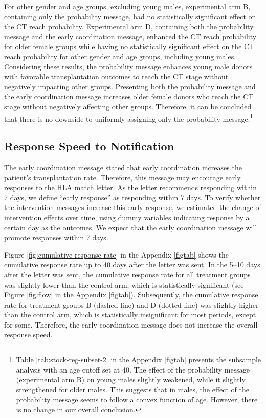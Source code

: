 \documentclass [12pt, a4paper]{article}
\begin{document}
For other gender and age groups, excluding young males, experimental arm B, containing only the probability message, had no statistically significant effect on the CT reach probability. Experimental arm D, containing both the probability message and the early coordination message, enhanced the CT reach probability for older female groups while having no statistically significant effect on the CT reach probability for other gender and age groups, including young males. Considering these results, the probability message enhances young male donors with favorable transplantation outcomes to reach the CT stage without negatively impacting other groups. Presenting both the probability message and the early coordination message increases older female donors who reach the CT stage without negatively affecting other groups. Therefore, it can be concluded that there is no downside to uniformly assigning only the probability message.\footnote{Table \ref{tab:stock-reg-subset-2} in the Appendix \ref{figtab} presents the subsample analysis with an age cutoff set at 40. The effect of the probability message (experimental arm B) on young males slightly weakened, while it slightly strengthened for older males. This suggests that in males, the effect of the probability message seems to follow a convex function of age. However, there is no change in our overall conclusion.}

\hypertarget{reply-speed}{%
\subsection{Response Speed to Notification}\label{reply-speed}}

The early coordination message stated that early coordination increases the patient's transplantation rate. Therefore, this message may encourage early responses to the HLA match letter. As the letter recommends responding within 7 days, we define ``early response'' as responding within 7 days. To verify whether the intervention messages increase this early response, we estimated the change of intervention effects over time, using dummy variables indicating response by a certain day as the outcomes. We expect that the early coordination message will promote responses within 7 days.

Figure \ref{fig:cumulative-response-rate} in the Appendix \ref{figtab} shows the cumulative response rate up to 40 days after the letter was sent. In the 5--10 days after the letter was sent, the cumulative response rate for all treatment groups was slightly lower than the control arm, which is statistically significant (see Figure \ref{fig:flow} in the Appendix \ref{figtab}). Subsequently, the cumulative response rate for treatment groups B (dashed line) and D (dotted line) was slightly higher than the control arm, which is statistically insignificant for most periods, except for some. Therefore, the early coordination message does not increase the overall response speed.
\end{document}
